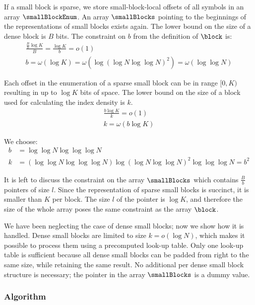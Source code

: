 If a small block is sparse, we store small-block-local offsets of all symbols \ph{} in an array $\smallBlockEnum$.
An array $\smallBlocks$ pointing to the beginnings of the representations of small blocks exists again.
The lower bound on the size of a dense block is $B$ bits.
The constraint on $b$ from the definition of $\block$ is:
\begin{gather*}
\frac{\frac{B}{b} \log K}{B} = \frac{\log K}{b} = o(1) \\
b = \omega(\log K) = \omega(\log(\log N \log \log N)^2) = \omega(\log \log N)
\end{gather*}

Each offset in the enumeration of a sparse small block can be in range $[0, K)$ resulting in up to $\log K$ bits of space.
The lower bound on the size of a block used for calculating the index density is $k$.
\begin{gather*}
\frac{b \log K}{k} = o(1) \\
k = \omega(b\log K)
\end{gather*}

We choose:
\begin{align*}
b &= \log \log N \log \log \log N \\
k &= (\log \log N \log \log \log N) \log(\log N \log \log N)^2 \log \log \log N = b^2
\end{align*}

It is left to discuss the constraint on the array $\smallBlocks$ which contains $\frac{B}{b}$ pointers of size $l$.
Since the representation of sparse small blocks is succinct, it is smaller than $K$ per block.
The size $l$ of the pointer is $\log K$, and therefore the size of the whole array poses the same constraint as the array $\block$.

\bigbreak

We have been neglecting the case of dense small blocks; now we show how it is handled.
Dense small blocks are limited to size $k = o(\log N)$, which makes it possible to process them using a precomputed look-up table.
Only one look-up table is sufficient because all dense small blocks can be padded from right to the same size, while retaining the same result.
No additional per dense small block structure is necessary; the pointer in the array $\smallBlocks$ is a dummy value.

\subsubsection{Algorithm}

